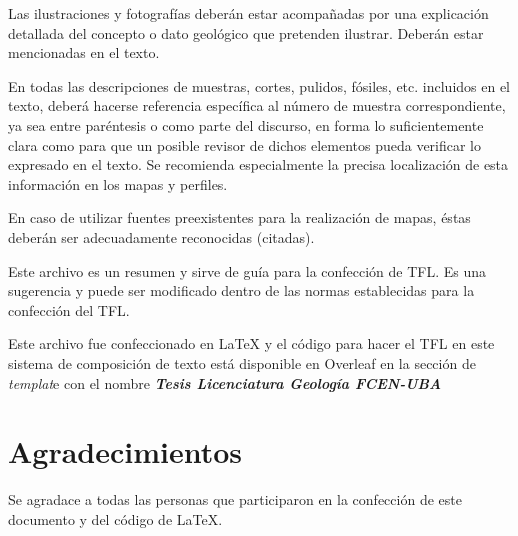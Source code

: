 \documentclass[11pt,a4paper]{article}
\begin{document}
 Las ilustraciones y fotografías deberán estar acompañadas por una explicación detallada del concepto o dato geológico que pretenden ilustrar. Deberán estar mencionadas en el texto.\par
 En todas las descripciones de muestras, cortes, pulidos, fósiles, etc. incluidos en el texto, deberá hacerse referencia específica al número de muestra correspondiente, ya sea entre paréntesis o como parte del discurso, en forma lo suficientemente clara como para que un posible revisor de dichos elementos pueda verificar lo expresado en el texto. Se recomienda especialmente la precisa localización de esta información en los mapas y perfiles. \par
 En caso de utilizar fuentes preexistentes para la realización de mapas, éstas deberán ser adecuadamente reconocidas (citadas).\par
 Este archivo es un resumen y sirve de guía para la confección de TFL. Es una sugerencia y puede ser modificado dentro de las normas establecidas para la confección del TFL.\par
 Este archivo fue confeccionado en \LaTeX{} y el código para hacer el TFL en este sistema de composición de texto está disponible en \textsf{Overleaf} en la sección de \textit{templat}e con el nombre  \textbf{\textit{Tesis Licenciatura Geología FCEN-UBA }}








\newpage
\thispagestyle{empty}
\section*{\Huge Agradecimientos}
Se agradace a todas las personas que participaron en la confección de este documento y del código de \LaTeX{}.
\newpage
\thispagestyle{empty}
\renewcommand\contentsname{\textbf{\Huge Índice}}
    \begin{center}
       \tableofcontents
       
    \end{center}
    
\end{document}
